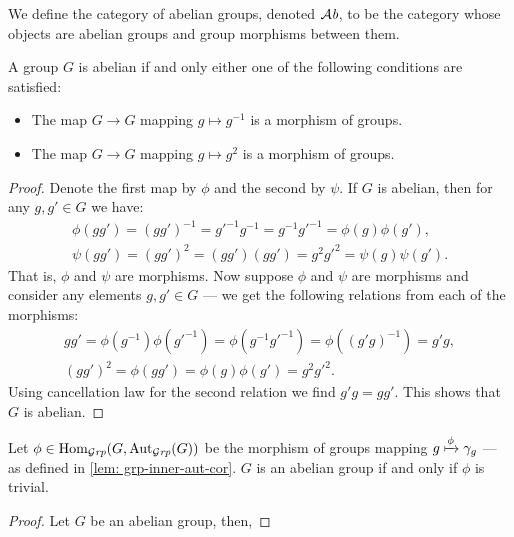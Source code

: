 \begin{definition}
  We define the category of abelian groups, denoted \({\mathcal{A}\textit{b}}\), to be the category
  whose objects are abelian groups and group morphisms between them.
\end{definition}

\begin{proposition}
  A group \(G\) is abelian if and only either one of the following conditions
  are satisfied:
  \begin{itemize}
    \setlength\itemsep{0em}
    \item The map \(G \to G\) mapping \(g \mapsto g^{-1}\) is a morphism of
      groups.
    \item The map \(G \to G\) mapping \(g \mapsto g^2\) is a morphism of groups.
  \end{itemize}
\end{proposition}

\begin{proof}
  Denote the first map by \(\phi\) and the second by \(\psi\). If \(G\) is
  abelian, then for any \(g, g' \in G\) we have:
  \begin{gather*}
    \phi(gg') = (gg')^{-1} = g'^{-1} g^{-1} = g^{-1}g'^{-1} = \phi(g) \phi(g'),
    \\
    \psi(gg') = (gg')^2 = (gg')(gg') = g^2g'^2 = \psi(g)\psi(g').
  \end{gather*}
  That is, \(\phi\) and \(\psi\) are morphisms. Now suppose \(\phi\) and
  \(\psi\) are morphisms and consider any elements \(g, g' \in G\) --- we get
  the following relations from each of the morphisms:
  \begin{gather*}
    gg' = \phi(g^{-1})\phi(g'^{-1}) = \phi(g^{-1}g'^{-1})
    = \phi((g'g)^{-1}) = g'g,
    \\
    (gg')^2 = \phi(gg') = \phi(g) \phi(g') = g^2 g'^2.
  \end{gather*}
  Using cancellation law for the second relation we find \(g'g = gg'\). This
  shows that \(G\) is abelian.
\end{proof}

\begin{proposition}
  Let \(\phi \in \operatorname{Hom}_{\mathcal{G}\textit{rp}}(G, \operatorname{Aut}_{\mathcal{G}\textit{rp}}(G))\) be the morphism of groups mapping
  \(g \xmapsto \phi \gamma_g\) --- as defined in \cref{lem: grp-inner-aut-cor}.
  \(G\) is an abelian group if and only if \(\phi\) is trivial.
\end{proposition}

\begin{proof}
  Let \(G\) be an abelian group, then,
\end{proof}

